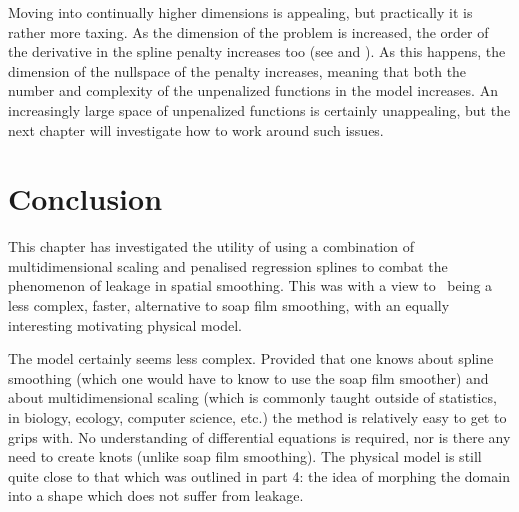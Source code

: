 Moving into continually higher dimensions is appealing, but practically it is rather more taxing. As the dimension of the problem is increased, the order of the derivative in the spline penalty increases too (see  and ). As this happens, the dimension of the nullspace of the penalty increases, meaning that both the number and complexity of the unpenalized functions in the model increases. An increasingly large space of unpenalized functions is certainly unappealing, but the next chapter will investigate how to work around such issues.

\section{Conclusion}
\label{mds-conc}

This chapter has investigated the utility of using a combination of multidimensional scaling and penalised regression splines to combat the phenomenon of leakage in spatial smoothing. This was with a view to \mdsap\ being a less complex, faster, alternative to soap film smoothing, with an equally interesting motivating physical model.

The model certainly seems less complex. Provided that one knows about spline smoothing (which one would have to know to use the soap film smoother) and about multidimensional scaling (which is commonly taught outside of statistics, in biology, ecology, computer science, etc.) the method is relatively easy to get to grips with. No understanding of differential equations is required, nor is there any need to create knots (unlike soap film smoothing). The physical model is still quite close to that which was outlined in  part 4: the idea of morphing the domain into a shape which does not suffer from leakage.

